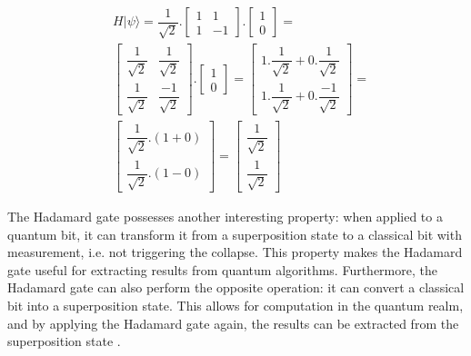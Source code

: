 			\begin{equation}
				\label{eq:hadamardApplyedNum}
				\begin{aligned}
					&H|\psi\rangle = \dfrac{1}{\sqrt{2}}.\begin{bmatrix}
						1& 1 \\
						1& -1
					\end{bmatrix} . \begin{bmatrix}
						1 \\
						0
					\end{bmatrix} = \\
					&\begin{bmatrix}
						\dfrac{1}{\sqrt{2}} &\dfrac{1}{\sqrt{2}} \\
						\dfrac{1}{\sqrt{2}} &\dfrac{-1}{\sqrt{2}}
					\end{bmatrix} .
					\begin{bmatrix}
						1 \\
						0
					\end{bmatrix} = 
					\begin{bmatrix}
						1 . \dfrac{1}{\sqrt{2}} + 0.\dfrac{1}{\sqrt{2}} \\
						1 . \dfrac{1}{\sqrt{2}} + 0.\dfrac{-1}{\sqrt{2}}
					\end{bmatrix} = \\
					&\begin{bmatrix}
						\dfrac{1}{\sqrt{2}} . (1 + 0) \\
						\dfrac{1}{\sqrt{2}} . (1 - 0)
					\end{bmatrix} = 
					\begin{bmatrix}
						\dfrac{1}{\sqrt{2}} \\
						\dfrac{1}{\sqrt{2}}
					\end{bmatrix}
				\end{aligned}
			\end{equation}
			
			\par The Hadamard gate possesses another interesting property: when applied to a quantum bit, it can transform it from a superposition state to a classical bit with measurement, i.e. not triggering the collapse. This property makes the Hadamard gate useful for extracting results from quantum algorithms. Furthermore, the Hadamard gate can also perform the opposite operation: it can convert a classical bit into a superposition state. This allows for computation in the quantum realm, and by applying the Hadamard gate again, the results can be extracted from the superposition state \cite{qcfcs}.\newline

